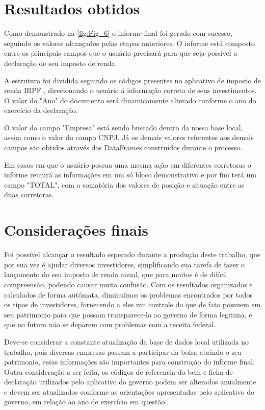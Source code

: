 \section{\textbf{Resultados obtidos}}\label{sec:resultado}

\par Como demonstrado na \autoref{fig:Fig_6} o informe final foi gerado com sucesso, seguindo os valores alcançados pelas etapas anteriores. O informe está composto entre os principais campos que o usuário precisará para que seja possível a declaração de seu imposto de renda.

\par A estrutura foi dividida seguindo os códigos presentes no aplicativo de imposto de renda IRPF  \textcite{IRPF2022}, direcionando o usuário á informação correta de seus investimentos. O valor do "Ano" do documento será dinamicamente alterado conforme o ano do exercício da declaração. 

\par O valor do campo "Empresa" está sendo buscado dentro da nossa base local, assim como o valor do campo CNPJ. Já os demais valores referentes aos demais campos são obtidos através dos DataFrames construídos durante o processo.

\par Em casos em que o usuário possua uma mesma ação em diferentes corretoras o informe reunirá as informações em um só bloco demonstrativo e por fim terá um campo "TOTAL", com a somatória dos valores de posição e situação entre as duas corretoras.

\section{\textbf{Considerações finais}}

Foi possível alcançar o resultado esperado durante a produção deste trabalho, que por sua vez é ajudar diversos investidores, simplificando sua tarefa de fazer o lançamento do seu imposto de renda anual, que para muitos é de difícil compreensão, podendo causar muita confusão.
Com os resultados organizados e calculados de forma autômata, diminuímos os problemas encontrados por todos os tipos de investidores, fornecendo a eles um controle do que de fato possuem em seu patrimonio para que possam transparece-lo ao governo de forma legitima, e que no futuro não se deparem com problemas com a receita federal.

 Deve-se considerar a constante atualização da base de dados local utilizada no trabalho, pois diversas empresas passam a participar da bolsa abrindo o seu  patrimonio, essas informações são importantes para construção do informe final.
Outra consideração a ser feita, os códigos de referencia do bem e ficha de declaração utilizados pelo aplicativo do governo podem ser alterados anualmente e devem ser atualizados conforme as orientações apresentadas pelo aplicativo do governo, em relação ao ano de exercício em questão.

